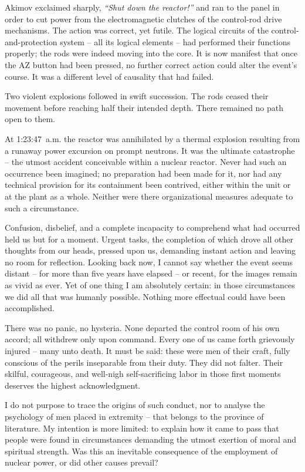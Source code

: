 \documentclass[openright]{bookest}
\begin{document}
Akimov exclaimed sharply, \textit{``Shut down the reactor!''} and ran to the panel in order to cut power from the electromagnetic clutches of the control-rod drive mechanisms. The action was correct, yet futile. The logical circuits of the control-and-protection system -- all its logical elements -- had performed their functions properly; the rods were indeed moving into the core. It is now manifest that once the AZ button had been pressed, no further correct action could alter the event's course. It was a different level of causality that had failed.

Two violent explosions followed in swift succession. The rods ceased their movement before reaching half their intended depth. There remained no path open to them.

At 1:23:47~a.m. the reactor was annihilated by a thermal explosion resulting from a runaway power excursion on prompt neutrons. It was the ultimate catastrophe -- the utmost accident conceivable within a nuclear reactor. Never had such an occurrence been imagined; no preparation had been made for it, nor had any technical provision for its containment been contrived, either within the unit or at the plant as a whole. Neither were there organizational measures adequate to such a circumstance.


Confusion, disbelief, and a complete incapacity to comprehend what had occurred held us but for a moment. Urgent tasks, the completion of which drove all other thoughts from our heads, pressed upon us, demanding instant action and leaving no room for reflection. Looking back now, I cannot say whether the event seems distant -- for more than five years have elapsed -- or recent, for the images remain as vivid as ever. Yet of one thing I am absolutely certain: in those circumstances we did all that was humanly possible. Nothing more effectual could have been accomplished.

There was no panic, no hysteria. None departed the control room of his own accord; all withdrew only upon command. Every one of us came forth grievously injured -- many unto death. It must be said: these were men of their craft, fully conscious of the perils inseparable from their duty. They did not falter. Their skilful, courageous, and well-nigh self-sacrificing labor in those first moments deserves the highest acknowledgment.

I do not purpose to trace the origins of such conduct, nor to analyse the psychology of men placed in extremity -- that belongs to the province of literature. My intention is more limited: to explain how it came to pass that people were found in circumstances demanding the utmost exertion of moral and spiritual strength. Was this an inevitable consequence of the employment of nuclear power, or did other causes prevail?
\end{document}
